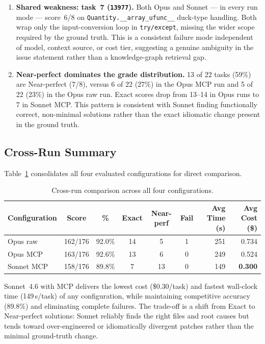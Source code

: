 \begin{enumerate}
\item \textbf{Shared weakness: task~7 (\texttt{13977}).}
      Both Opus and Sonnet --- in every run mode --- score~6/8 on
      \texttt{Quantity.\_\_array\_ufunc\_\_} duck-type handling.
      Both wrap only the input-conversion loop in
      \texttt{try/except}, missing the wider scope required by the
      ground truth.  This is a consistent failure mode independent
      of model, context source, or cost tier, suggesting a genuine
      ambiguity in the issue statement rather than a knowledge-graph
      retrieval gap.

\item \textbf{Near-perfect dominates the grade distribution.}
      13 of 22 tasks (59\%) are Near-perfect (7/8), versus 6 of 22
      (27\%) in the Opus MCP run and 5 of 22 (23\%) in the Opus raw
      run.  Exact scores drop from 13--14 in Opus runs to 7 in
      Sonnet MCP.  This pattern is consistent with Sonnet finding
      functionally correct, non-minimal solutions rather than the
      exact idiomatic change present in the ground truth.

\end{enumerate}

\subsection{Cross-Run Summary}\label{sec:mcp-sonnet-crossrun}

Table~\ref{tab:crossrun} consolidates all four evaluated configurations
for direct comparison.

\begin{table}[h]
\centering
\small
\caption{Cross-run comparison across all four configurations.}\label{tab:crossrun}
\setlength{\tabcolsep}{5pt}
\begin{tabular}{lcccccrr}
\toprule
\textbf{Configuration} & \textbf{Score} & \textbf{\%} & \textbf{Exact} & \textbf{Near-perf} & \textbf{Fail} & \textbf{Avg Time (s)} & \textbf{Avg Cost (\$)} \\
\midrule
Opus raw          & 162/176 & 92.0\% & 14 & 5  & 1 & 251 & 0.734 \\
Opus MCP          & 163/176 & 92.6\% & 13 & 6  & 0 & 249 & 0.524 \\
Sonnet MCP        & 158/176 & 89.8\% &  7 & 13 & 0 & 149 & \textbf{0.300} \\
\bottomrule
\end{tabular}
\end{table}

\noindent
Sonnet~4.6 with MCP delivers the lowest cost (\$0.30/task) and fastest
wall-clock time (149\,s/task) of any configuration, while maintaining
competitive accuracy (89.8\%) and eliminating complete failures.
The trade-off is a shift from Exact to Near-perfect solutions: Sonnet
reliably finds the right files and root causes but tends toward
over-engineered or idiomatically divergent patches rather than the
minimal ground-truth change.
